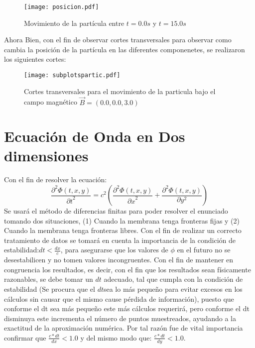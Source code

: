 \documentclass[11pt,letterpaper]{exam}
\begin{document}
\begin{figure}[H]
\begin{center}
\texttt{[image: posicion.pdf]} 
\caption{\label{fig:typical}Movimiento de la part\'icula entre $t=0.0s$ y $t=15.0s$}
\end{center}
\end{figure}
Ahora Bien, con el fin de observar cortes transversales para observar como cambia la posici\'on de la part\'icula en las diferentes componenetes, se realizaron los siguientes cortes:
\begin{figure}[H]
\begin{center}
\texttt{[image: subplotspartic.pdf]} 
\caption{\label{fig:typical}Cortes transversales para el movimiento de la particula bajo el campo magn\'etico $\vec{B}=(0.0,0.0,3.0)$}
\end{center}
\end{figure}




\noindent
\section{Ecuaci\'on de Onda en Dos dimensiones}
Con el fin de resolver la ecuaci\'on:
\begin{equation}
\frac{{\partial}^2\Phi(t,x,y)}{{\partial t}^2}={c}^2(\frac{{\partial}^2\Phi(t,x,y)}{{\partial x}^2}+\frac{{\partial}^2\Phi(t,x,y)}{{\partial} y^2})
\end{equation}
Se usar\'a el m\'etodo de diferencias finitas para poder resolver el enunciado tomando dos situaciones, (1) Cuando la membrana tenga fronteras fijas y (2) Cuando la membrana tenga fronteras libres. Con el fin de realizar un correcto tratamiento de datos se tomar\'a en cuenta la importancia de la condici\'on de estabilidad:$dt<\frac{dx}{c}$, para asegurarse que los valores de $\phi$ en el futuro no se desestabilicen y no tomen valores incongruentes.
Con el fin de mantener en congruencia los resultados, es decir, con el fin que los resultados sean f\'isicamente razonables, se debe tomar un $dt$ adecuado, tal que cumpla con la condici\'on de estabilidad (Se procura que el $dt$sea lo m\'as peque\~no para evitar excesos en los c\'alculos sin causar que el mismo cause p\'erdida de informaci\'on), puesto que conforme el dt sea m\'as peque\~no este m\'as c\'alculos requerir\'a, pero conforme el dt disminuya este incrementa el n\'umero de puntos muestreados, ayudando a la exactitud de la aproximaci\'on num\'erica. Por tal raz\'on fue de vital importancia confirmar que $\frac{c*dt}{dx}<1.0$ y del mismo modo que: $\frac{c*dt}{dy}<1.0$.
\end{document}
